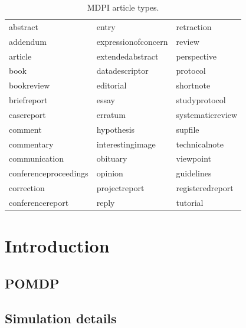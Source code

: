\documentclass[notspecified,article,submit,moreauthors,pdftex]{Definitions/mdpi}
\begin{document}

\begin{table}

\caption{\label{tab:mdpitype}MDPI article types.}
\centering
\begin{tabular}[t]{lll}
\toprule
abstract & entry & retraction\\
addendum & expressionofconcern & review\\
article & extendedabstract & perspective\\
book & datadescriptor & protocol\\
bookreview & editorial & shortnote\\
\addlinespace
briefreport & essay & studyprotocol\\
casereport & erratum & systematicreview\\
comment & hypothesis & supfile\\
commentary & interestingimage & technicalnote\\
communication & obituary & viewpoint\\
\addlinespace
conferenceproceedings & opinion & guidelines\\
correction & projectreport & registeredreport\\
conferencereport & reply & tutorial\\
\bottomrule
\end{tabular}
\end{table}

\section{Introduction}\label{introduction}

\subsection{POMDP}\label{pomdp}

\subsection{Simulation details}\label{simulation-details}
\end{document}
